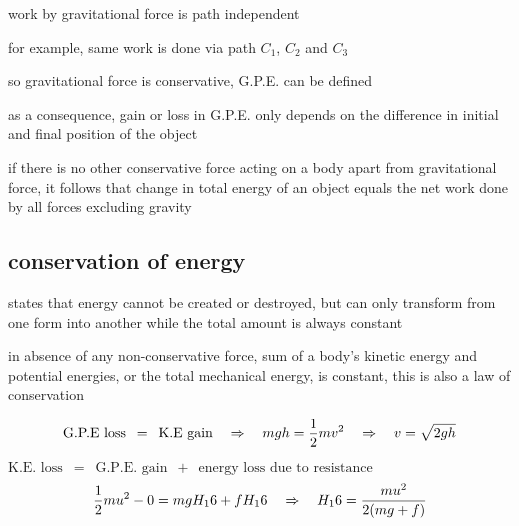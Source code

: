 work by gravitational force is path independent

for example, same work is done via path $C_1$, $C_2$ and $C_3$

so gravitational force is conservative, G.P.E. can be defined

as a consequence, gain or loss in G.P.E. only depends on the difference in initial and final position of the object

if there is no other conservative force acting on a body apart from gravitational force, it follows that change in total energy of an object equals the net work done by all forces excluding gravity





\subsection{conservation of energy}

\begin{ilight}
	 states that energy cannot be created or destroyed, but can only transform from one form into another while the total amount is always constant  
\end{ilight}

in absence of any non-conservative force, sum of a body's kinetic energy and potential energies, or the total mechanical energy,  is constant, this is also a law of conservation



\begin{soln}
\begin{equation*}
	\text{G.P.E loss} \,\,\, = \,\,\, \text{K.E gain} \quad \Rightarrow \quad mgh = \frac{1}{2}mv^2 \quad \Rightarrow \quad v=\sqrt{2gh} 
\end{equation*}
\end{soln}


\begin{soln} $\text{K.E. loss} \,\,\, = \,\,\, \text{G.P.E. gain} \,\,\, + \,\,\, \text{energy loss due to resistance}$
\begin{equation*}
	\frac{1}{2}mu^2 - 0 = mgH_16 + f H_16 \quad \Rightarrow \quad  H_16 = \frac{mu^2}{2(mg+f)}
\end{equation*}
\end{soln}

